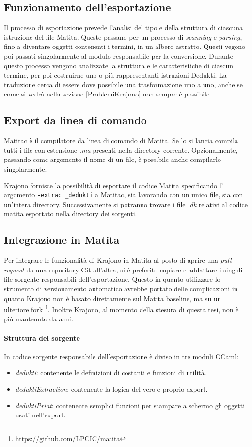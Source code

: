 \documentclass[12pt,a4paper]{report}
\begin{document}
\subsection{Funzionamento dell'esportazione}
Il processo di esportazione prevede l'analisi del tipo e della struttura di 
ciascuna istruzione del file Matita. Queste passano per un processo di 
\textit{scanning} e \textit{parsing}, fino a diventare oggetti contenenti i
termini, in un albero astratto. Questi vegono poi passati singolarmente al
modulo responsabile per la conversione. Durante questo processo vengono
analizzate la struttura e le caratteristiche di ciascun termine, per poi
costruirne uno o più rappresentanti istruzioni Dedukti. La traduzione cerca 
di essere dove possibile una trasformazione uno a uno, anche se come si vedrà
nella sezione \ref{ProblemiKrajono} non sempre è possibile.

\subsection{Export da linea di comando}
Matitac è il compilatore da linea di comando di Matita. Se lo si lancia compila
tutti i file con estensione \textit{.ma} presenti nella directory corrente. 
Opzionalmente, passando come argomento il nome di un file, è possibile anche 
compilarlo singolarmente. 

Krajono fornisce la possibilità di esportare il codice Matita specificando l'
argomento \texttt{-extract\_dedukti} a Matitac, sia lavorando con un unico file,
sia con un'intera directory. Successivamente si potranno trovare i file \textit{.dk} 
relativi al codice matita esportato nella directory dei sorgenti.

\subsection{Integrazione in Matita}
Per integrare le funzionalità di Krajono in Matita al posto di aprire una \textit{
pull request} da una repository Git all'altra, si è preferito copiare e addattare i
singoli file sorgente responsabili dell'esportazione. Questo in quanto utilizzare
lo strumento di versionamento automatico avrebbe portato delle complicazioni in
quanto Krajono non è basato direttamente sul Matita baseline, ma su un ulteriore
fork \footnote{https://github.com/LPCIC/matita}. Inoltre Krajono, al momento della
stesura di questa tesi, non è più mantenuto da anni. 

\paragraph{Struttura del sorgente}
In codice sorgente responsabile dell'esportazione è diviso in tre moduli OCaml:
\begin{itemize}
  \item \textit{dedukti}: contenente le definizioni di costanti e funzioni
    di utilità.
  \item \textit{deduktiExtraction}: contenente la logica del vero e proprio 
    export.
  \item \textit{deduktiPrint}: contenente semplici funzioni per stampare a 
    schermo gli oggetti usati nell'export.
\end{itemize}
\end{document}
